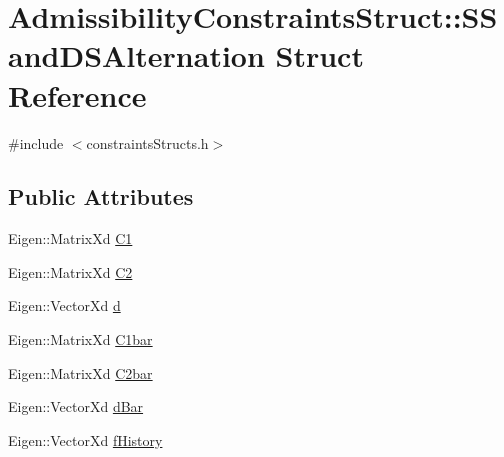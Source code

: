 \hypertarget{structAdmissibilityConstraintsStruct_1_1SSandDSAlternation}{\section{\-Admissibility\-Constraints\-Struct\-:\-:\-S\-Sand\-D\-S\-Alternation \-Struct \-Reference}
\label{structAdmissibilityConstraintsStruct_1_1SSandDSAlternation}
}


{\ttfamily \#include $<$constraints\-Structs.\-h$>$}

\subsection*{\-Public \-Attributes}
\begin{DoxyCompactItemize}
\item 
\-Eigen\-::\-Matrix\-Xd \hyperlink{structAdmissibilityConstraintsStruct_1_1SSandDSAlternation_ad8c275715499505ab842c0aa3cf422fe}{\-C1}
\item 
\-Eigen\-::\-Matrix\-Xd \hyperlink{structAdmissibilityConstraintsStruct_1_1SSandDSAlternation_a5c169268d67d6a949dea763b6f71c4c5}{\-C2}
\item 
\-Eigen\-::\-Vector\-Xd \hyperlink{structAdmissibilityConstraintsStruct_1_1SSandDSAlternation_ab40c36a6b9d326f612d7380493716bbc}{d}
\item 
\-Eigen\-::\-Matrix\-Xd \hyperlink{structAdmissibilityConstraintsStruct_1_1SSandDSAlternation_ac6c3cf83c627777487ad717c1cf9b40f}{\-C1bar}
\item 
\-Eigen\-::\-Matrix\-Xd \hyperlink{structAdmissibilityConstraintsStruct_1_1SSandDSAlternation_aa2118aa17c20af2515c770ba9943f52b}{\-C2bar}
\item 
\-Eigen\-::\-Vector\-Xd \hyperlink{structAdmissibilityConstraintsStruct_1_1SSandDSAlternation_a9099e9134eefdb5d540ec8a3eec5acb6}{d\-Bar}
\item 
\-Eigen\-::\-Vector\-Xd \hyperlink{structAdmissibilityConstraintsStruct_1_1SSandDSAlternation_abacb8f39b18c0960834a0ebc1d46ba28}{f\-History}
\end{DoxyCompactItemize}


